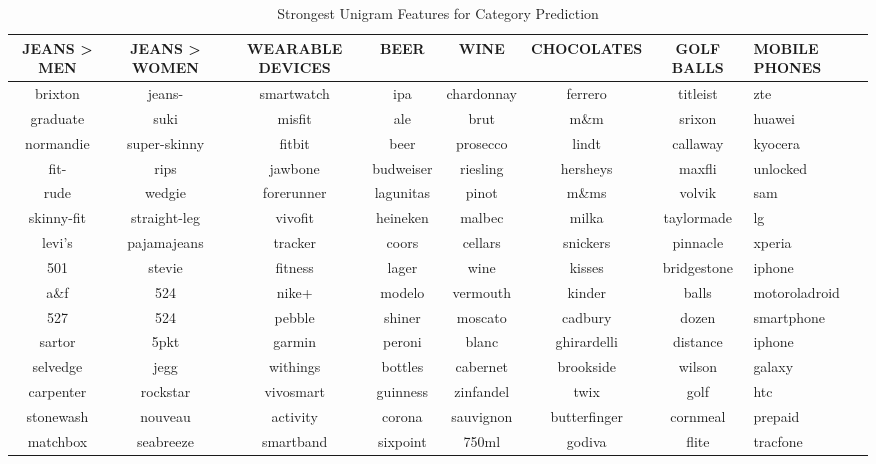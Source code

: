 \begin{table}
  \caption{Strongest Unigram Features for Category Prediction}
  \label{tab:features}
  \begin{tabular}{cccccccl}
    \toprule
    JEANS > MEN	&	JEANS > WOMEN	&	WEARABLE DEVICES	&	 BEER	&	 WINE	&	CHOCOLATES	&	 GOLF BALLS	 & MOBILE PHONES \\
    \midrule
    brixton	&	jeans-	&	smartwatch	&	ipa	&	chardonnay	&	ferrero	&	titleist	&	zte	\\
    graduate	&	suki	&	misfit	&	ale	&	brut	&	m\&m	&	srixon	&	huawei	\\
    normandie	&	super-skinny	&	fitbit	&	beer	&	prosecco	&	lindt	&	callaway	&	kyocera	\\
    fit-	&	rips	&	jawbone	&	budweiser	&	riesling	&	hersheys	&	maxfli	&	unlocked	\\
    rude	&	wedgie	&	forerunner	&	lagunitas	&	pinot	&	m\&ms	&	volvik	&	sam	\\
    skinny-fit	&	straight-leg &	vivofit	&	heineken	&	malbec	&	milka	&	taylormade	&	lg	\\
    levi's\textregistered	&	pajamajeans	&	tracker	&	coors	&	cellars	&	snickers	&	pinnacle	&	xperia	\\
    501	&	stevie	&	fitness	&	lager	&	wine	&	kisses	&	bridgestone	&	iphone	\\
    a\&f	&	524\texttrademark	&	nike+	&	modelo	&	vermouth	&	kinder	&	balls	&	motoroladroid	\\
    527	&	524	&	pebble	&	shiner	&	moscato	&	cadbury	&	dozen	&	smartphone	\\
    sartor	&	5pkt	&	garmin	&	peroni	&	blanc	&	ghirardelli	&	distance	&	 iphone\textregistered	\\
    selvedge	&	jegg	&	withings	&	bottles	&	cabernet	&	brookside	&	wilson	&	galaxy	\\
    carpenter	&	rockstar	&	vivosmart	&	guinness	&	zinfandel	&	twix	&	golf	&	htc	\\
    stonewash	&	nouveau	&	activity	&	corona	&	sauvignon	&	butterfinger	&	cornmeal	&	prepaid	\\
    matchbox	&	seabreeze	&	smartband	&	sixpoint	&	750ml	&	godiva	&	flite	&	tracfone \\
    \bottomrule
  \end{tabular}
\end{table}


